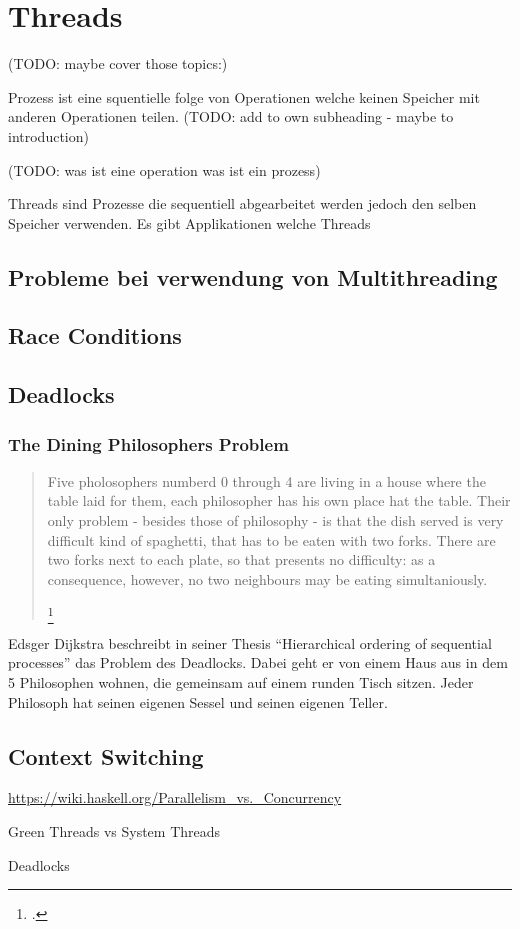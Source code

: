 \section{Threads}
\label{section: Threads}


(TODO: maybe cover those topics:)



Prozess ist eine squentielle folge von Operationen welche keinen Speicher mit anderen Operationen teilen. (TODO: add to own subheading - maybe to introduction)


(TODO: was ist eine operation was ist ein prozess)

Threads sind Prozesse die sequentiell abgearbeitet werden jedoch den selben Speicher verwenden. \cite[p. 2]{Lee06} Es gibt Applikationen welche Threads








\subsection{Probleme bei verwendung von Multithreading}

\subsection{Race Conditions}

\subsection{Deadlocks}

\subsubsection{The Dining Philosophers Problem}

\blockquote[{\footcite[S. 21]{dij71}}]{
	Five pholosophers numberd 0 through 4 are living in a house where the table laid for them, each philosopher has his own place hat the table. Their only problem - besides those of philosophy - is that the dish served is very difficult kind of spaghetti, that has to be eaten with two forks. There are two forks next to each plate, so that presents no difficulty: as a consequence, however, no two neighbours may be eating simultaniously.
} 


Edsger Dijkstra beschreibt in seiner Thesis ``Hierarchical ordering of sequential processes'' das Problem des Deadlocks. Dabei geht er von einem Haus aus in dem 5 Philosophen wohnen, die gemeinsam auf einem runden Tisch sitzen. Jeder Philosoph hat seinen eigenen Sessel und seinen eigenen Teller. 



\cite[p. 21]{dij71}




\subsection{Context Switching}



\url{https://wiki.haskell.org/Parallelism_vs._Concurrency}

Green Threads vs System Threads

Deadlocks
